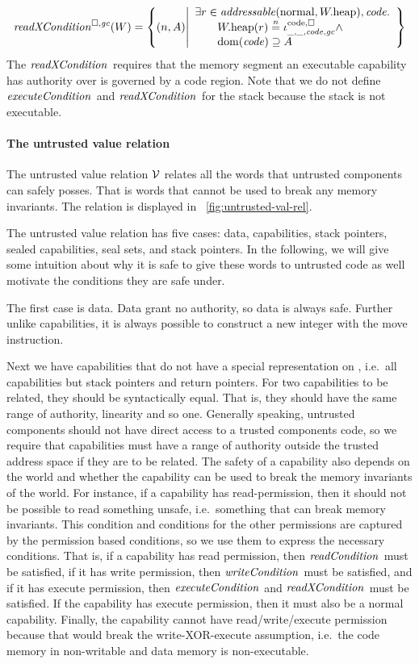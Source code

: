 \begin{jversion}
\[
  \xReadCond{W} = \left\{ \npair{A} \middle| 
    \begin{array}{l}
      \exists r \in \addressable{\normal, \pwheap}, \code \ldotp \\
      \qquad \pwheap(r) \nequal \codereg{\_,\_,\code,\gc}\wedge\\
      \qquad \dom(\code) \supseteq A 
    \end{array}
  \right\}
\]
The $\xReadCond[]{}$ requires that the memory segment an executable capability has authority over is governed by a code region.
Note that we do not define $\execCond[]{}$ and $\xReadCond[]{}$ for the stack because the stack is not executable.

\paragraph{The untrusted value relation}
\label{par:untrusted-val-rel}
The untrusted value relation $\mathcal{V}$ relates all the words that untrusted components can safely posses.
That is words that cannot be used to break any memory invariants.
The relation is displayed in \figurename~\ref{fig:untrusted-val-rel}.

The untrusted value relation has five cases: data, capabilities, stack pointers, sealed capabilities, seal sets, and stack pointers.
In the following, we will give some intuition about why it is safe to give these words to untrusted code as well motivate the conditions they are safe under.

The first case is data.
Data grant no authority, so data is always safe.
Further unlike capabilities, it is always possible to construct a new integer with the move instruction.

Next we have capabilities that do not have a special representation on \srccm{}, i.e.\ all capabilities but stack pointers and return pointers.
For two capabilities to be related, they should be syntactically equal.
That is, they should have the same range of authority, linearity and so one.
Generally speaking, untrusted components should not have direct access to a trusted components code, so we require that capabilities must have a range of authority outside the trusted address space if they are to be related.
The safety of a capability also depends on the world and whether the capability can be used to break the memory invariants of the world.
For instance, if a capability has read-permission, then it should not be possible to read something unsafe, i.e.\ something that can break memory invariants.
This condition and conditions for the other permissions are captured by the permission based conditions, so we use them to express the necessary conditions.
That is, if a capability has read permission, then $\readCond[]{}$ must be satisfied, if it has write permission, then $\writeCond[]{}$ must be satisfied, and if it has execute permission, then $\execCond[]{}$ and $\xReadCond[]{}$ must be satisfied.
If the capability has execute permission, then it must also be a normal capability.
Finally, the capability cannot have read/write/execute permission because that would break the write-XOR-execute assumption, i.e.\ the code memory in non-writable and data memory is non-executable.


\end{jversion}
